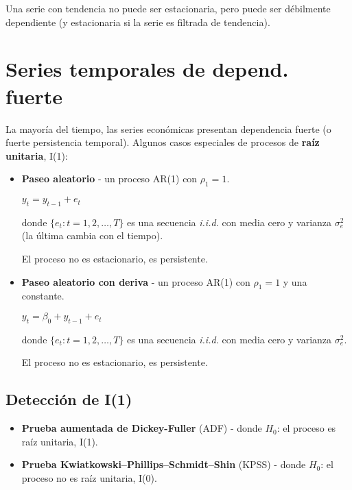\documentclass[10pt, a4paper, landscape]{extarticle}
\begin{document}
\begin{multicols}{3}
Una serie con tendencia no puede ser estacionaria, pero puede ser débilmente dependiente (y estacionaria si la serie es filtrada de tendencia).

\columnbreak

\section*{Series temporales de depend. fuerte}

La mayoría del tiempo, las series económicas presentan dependencia fuerte (o fuerte persistencia temporal). Algunos casos especiales de procesos de \textbf{raíz unitaria}, I(1):

\begin{itemize}[leftmargin=*]
		\item \textbf{Paseo aleatorio} - un proceso AR(1) con $\rho_1 = 1$.
	\begin{center}
		$y_t = y_{t - 1} + e_t$
	\end{center}
	donde $\lbrace e_t : t = 1, 2, \ldots, T \rbrace$ es una secuencia \textsl{i.i.d.} con media cero y varianza $\sigma^2_e$ (la última cambia con el tiempo).
	
		El proceso no es estacionario, es persistente.
	
	\item \textbf{Paseo aleatorio con deriva} - un proceso AR(1) con $\rho_1 = 1$ y una constante.
	\begin{center}
		$y_t = \beta_0 + y_{t - 1} + e_t$
	\end{center}
	donde $\lbrace e_t : t = 1, 2, \ldots, T \rbrace$ es una secuencia \textsl{i.i.d.} con media cero y varianza $\sigma^2_e$.

	El proceso no es estacionario, es persistente.
\end{itemize}

\subsection*{Detección de I(1)}

\begin{itemize}[leftmargin=*]
	\item \textbf{Prueba aumentada de Dickey-Fuller} (ADF) - donde $H_0$: el proceso es raíz unitaria, I(1).
	\item \textbf{Prueba Kwiatkowski–Phillips–Schmidt–Shin} (KPSS) - donde $H_0$: el proceso no es raíz unitaria, I(0).
\end{itemize}


\end{multicols}
\end{document}
